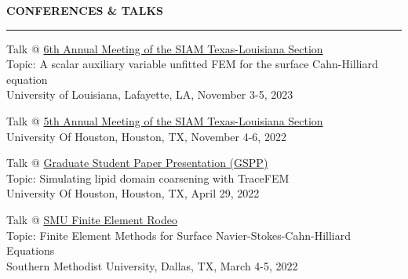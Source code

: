 \documentclass[10pt,letterpaper]{letter}
\newcommand{\gsect}[1]{\textcolor{codepurple}{\textbf{{\Large \uppercase{#1} }}} \\ \hrule}
\begin{document}
\gsect{Conferences \& Talks}
\begin{etaremune}
	\item Talk @ \href{https://userweb.ucs.louisiana.edu/~C00424602/SIAMTXLA2023/}{6th Annual Meeting of the SIAM Texas-Louisiana Section} \\
	Topic: A scalar auxiliary variable unfitted FEM for the surface Cahn-Hilliard equation\\
	University of Louisiana, Lafayette, LA, November 3-5, 2023
	
	\item Talk @ \href{https://www.math.uh.edu/siamtxla22/index.shtml}{5th Annual Meeting of the SIAM Texas-Louisiana Section} \\
	University Of Houston, Houston, TX, November 4-6, 2022
	
	\item Talk @ \href{https://uh.edu/nsm/math/news-events/stories/2022-math/gspp_2022/}{Graduate Student Paper Presentation (GSPP)} \\
	 Topic: Simulating lipid domain coarsening with TraceFEM\\
	 University Of Houston, Houston, TX, April 29, 2022
	
	\item Talk @ \href{https://people.smu.edu/sxu/2022-smu-fe-rodeo/}{SMU Finite Element Rodeo} \\ 
	Topic: Finite Element Methods for Surface Navier-Stokes-Cahn-Hilliard Equations \\
	Southern Methodist University, Dallas, TX, March 4-5, 2022
\end{etaremune}
\end{document}
